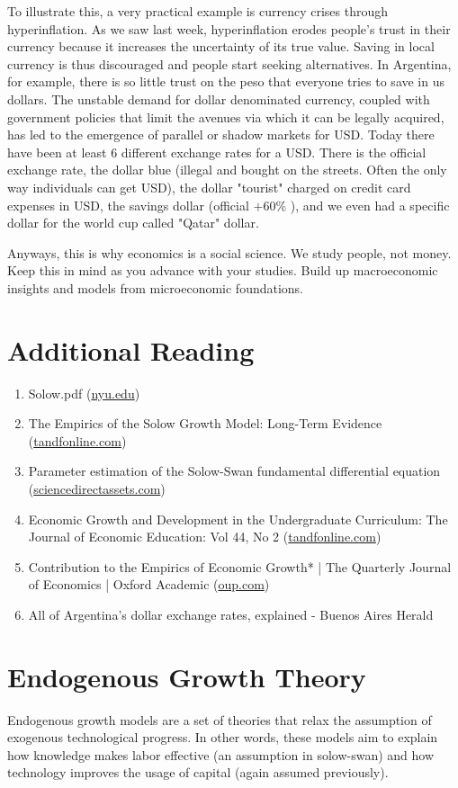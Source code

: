 \documentclass[10pt]{article}
\begin{document}
To illustrate this, a very practical example is currency crises through hyperinflation. As we saw last week, hyperinflation erodes people's trust in their currency because it increases the uncertainty of its true value. Saving in local currency is thus discouraged and people start seeking alternatives. In Argentina, for example, there is so little trust on the peso that everyone tries to save in us dollars. The unstable demand for dollar denominated currency, coupled with government policies that limit the avenues via which it can be legally acquired, has led to the emergence of parallel or shadow markets for USD. Today there have been at least 6 different exchange rates for a USD. There is the official exchange rate, the dollar blue (illegal and bought on the streets. Often the only way individuals can get USD), the dollar "tourist" charged on credit card expenses in USD, the savings dollar (official $+60 \%$ ), and we even had a specific dollar for the world cup called "Qatar" dollar.

Anyways, this is why economics is a social science. We study people, not money. Keep this in mind as you advance with your studies. Build up macroeconomic insights and models from microeconomic foundations.

\section*{Additional Reading}
\begin{enumerate}
  \item Solow.pdf (\href{http://nyu.edu}{nyu.edu})
  \item The Empirics of the Solow Growth Model: Long-Term Evidence (\href{http://tandfonline.com}{tandfonline.com})
  \item Parameter estimation of the Solow-Swan fundamental differential equation (\href{http://sciencedirectassets.com}{sciencedirectassets.com})
  \item Economic Growth and Development in the Undergraduate Curriculum: The Journal of Economic Education: Vol 44, No 2 (\href{http://tandfonline.com}{tandfonline.com})
  \item Contribution to the Empirics of Economic Growth* | The Quarterly Journal of Economics | Oxford Academic (\href{http://oup.com}{oup.com})
  \item All of Argentina's dollar exchange rates, explained - Buenos Aires Herald
\end{enumerate}

\section*{Endogenous Growth Theory}
Endogenous growth models are a set of theories that relax the assumption of exogenous technological progress. In other words, these models aim to explain how knowledge makes labor effective (an assumption in solow-swan) and how technology improves the usage of capital (again assumed previously).
\end{document}
